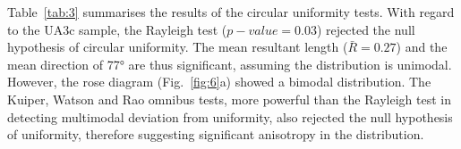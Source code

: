 \documentclass[preprint,authoryear,times]{elsarticle} %
\begin{document}
\begin{table}[]
  \caption{Value and $p-value$ of circular uniformity test statistics.}
  \label{tab:3}
\end{table}

Table~\ref{tab:3} summarises the results of the circular uniformity tests.
With regard to the UA3c sample, the Rayleigh test ($p-value=0.03$) rejected the null hypothesis of circular uniformity. The mean resultant length ($\bar{R}=0.27$) and the mean direction of 77° are thus significant, assuming the distribution is unimodal. However, the rose diagram (Fig.~\ref{fig:6}a) showed a bimodal distribution. The Kuiper, Watson and Rao omnibus tests, more powerful than the Rayleigh test in detecting multimodal deviation from uniformity, also rejected the null hypothesis of uniformity, therefore suggesting significant anisotropy in the distribution.
\end{document}
